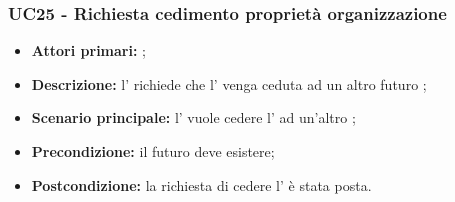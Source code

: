 \documentclass[../analisi-dei-requisiti]{subfiles}
\begin{document}
\subsubsection{UC25 - Richiesta cedimento proprietà organizzazione}
\label{subsub:UC25}

\begin{itemize}
\item \textbf{Attori primari:} ;
\item \textbf{\textbf{Descrizione:}} l'  richiede che l' venga ceduta ad un altro futuro ;
\item \textbf{\textbf{Scenario principale:}} l'  vuole cedere l' ad un'altro ;
\item \textbf{Precondizione:} il futuro  deve esistere;
\item \textbf{Postcondizione:} la richiesta di cedere l' è stata posta.

\end{itemize}

\end{document}
